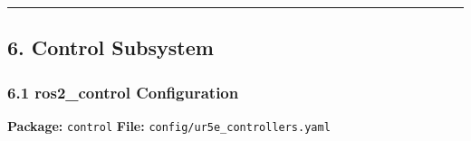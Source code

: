 \documentclass[
]{article}
\begin{document}
\begin{center}\rule{0.5\linewidth}{0.5pt}\end{center}

\hypertarget{control-subsystem}{%
\subsection{6. Control Subsystem}\label{control-subsystem}}

\hypertarget{ros2_control-configuration}{%
\subsubsection{6.1 ros2\_control
Configuration}\label{ros2_control-configuration}}

\textbf{Package:} \texttt{control} \textbf{File:}
\texttt{config/ur5e\_controllers.yaml}
\end{document}
